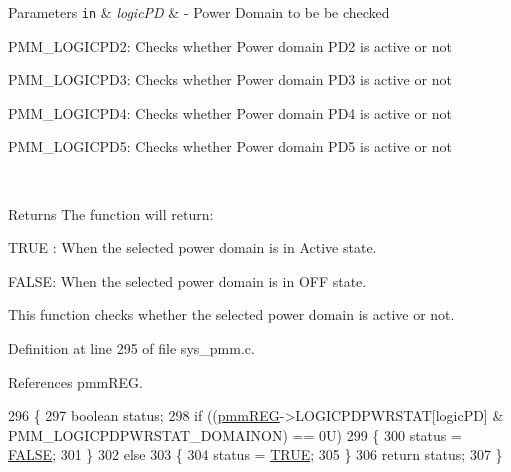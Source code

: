 \begin{DoxyParams}[1]{Parameters}
\mbox{\tt in}  & {\em logic\+PD} & -\/ Power Domain to be be checked
\begin{DoxyItemize}
\item P\+M\+M\+\_\+\+L\+O\+G\+I\+C\+P\+D2\+: Checks whether Power domain P\+D2 is active or not
\item P\+M\+M\+\_\+\+L\+O\+G\+I\+C\+P\+D3\+: Checks whether Power domain P\+D3 is active or not
\item P\+M\+M\+\_\+\+L\+O\+G\+I\+C\+P\+D4\+: Checks whether Power domain P\+D4 is active or not
\item P\+M\+M\+\_\+\+L\+O\+G\+I\+C\+P\+D5\+: Checks whether Power domain P\+D5 is active or not 
\end{DoxyItemize}\\
\hline
\end{DoxyParams}
\begin{DoxyReturn}{Returns}
The function will return\+:
\begin{DoxyItemize}
\item T\+R\+UE \+: When the selected power domain is in Active state.
\item F\+A\+L\+SE\+: When the selected power domain is in O\+FF state.
\end{DoxyItemize}
\end{DoxyReturn}
This function checks whether the selected power domain is active or not. 

Definition at line 295 of file sys\+\_\+pmm.\+c.



References pmm\+R\+EG.


\begin{DoxyCode}
296 \{
297     \textcolor{keywordtype}{boolean} status;
298     \textcolor{keywordflow}{if} ((\mbox{\hyperlink{reg__pmm_8h_a57b193bea1bf1951b97bdfee07f48598}{pmmREG}}->LOGICPDPWRSTAT[logicPD] & PMM\_LOGICPDPWRSTAT\_DOMAINON) == 0U)
299     \{
300         status = \mbox{\hyperlink{hal__stdtypes_8h_aa93f0eb578d23995850d61f7d61c55c1}{FALSE}};
301     \}
302     \textcolor{keywordflow}{else}
303     \{
304         status = \mbox{\hyperlink{hal__stdtypes_8h_aa8cecfc5c5c054d2875c03e77b7be15d}{TRUE}};
305     \}
306     \textcolor{keywordflow}{return} status;
307 \}
\end{DoxyCode}
\mbox{\label{group__PMM_gad92e152a45b5bfa862b930273264f9be}} 
